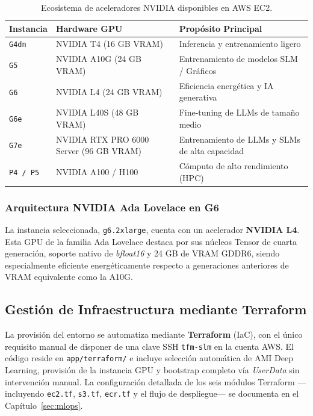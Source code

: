 \begin{table}[H]
\centering
\begin{tabularx}{\textwidth}{|l|X|l|}
\hline
\textbf{Instancia} & \textbf{Hardware GPU} & \textbf{Propósito Principal} \\ \hline
\texttt{G4dn} & NVIDIA T4 (16 GB VRAM) & Inferencia y entrenamiento ligero \\ \hline
\texttt{G5} & NVIDIA A10G (24 GB VRAM) & Entrenamiento de modelos SLM / Gráficos \\ \hline
\texttt{G6} & NVIDIA L4 (24 GB VRAM) & Eficiencia energética y IA generativa \\ \hline
\texttt{G6e} & NVIDIA L40S (48 GB VRAM) & Fine-tuning de LLMs de tamaño medio \\ \hline
\texttt{G7e} & NVIDIA RTX PRO 6000 Server (96 GB VRAM) & Entrenamiento de LLMs y SLMs de alta capacidad \\ \hline
\texttt{P4 / P5} & NVIDIA A100 / H100 & Cómputo de alto rendimiento (HPC) \\ \hline
\end{tabularx}
\caption{Ecosistema de aceleradores NVIDIA disponibles en AWS EC2.}
\label{tab:aws_instances}
\end{table}

\subsubsection{Arquitectura NVIDIA Ada Lovelace en G6}
La instancia seleccionada, \texttt{g6.2xlarge}, cuenta con un acelerador \textbf{NVIDIA L4}. Esta GPU de la familia Ada Lovelace destaca por sus núcleos Tensor de cuarta generación, soporte nativo de \textit{bfloat16} y 24 GB de VRAM GDDR6, siendo especialmente eficiente energéticamente respecto a generaciones anteriores de VRAM equivalente como la A10G.

\subsection{Gestión de Infraestructura mediante Terraform}
La provisión del entorno se automatiza mediante \textbf{Terraform} (IaC), con el único requisito manual de disponer de una clave SSH \texttt{tfm-slm} en la cuenta AWS. El código reside en \texttt{app/terraform/} e incluye selección automática de AMI Deep Learning, provisión de la instancia GPU y bootstrap completo vía \textit{UserData} sin intervención manual. La configuración detallada de los seis módulos Terraform ---incluyendo \texttt{ec2.tf}, \texttt{s3.tf}, \texttt{ecr.tf} y el flujo de despliegue--- se documenta en el Capítulo~\ref{sec:mlops}.

